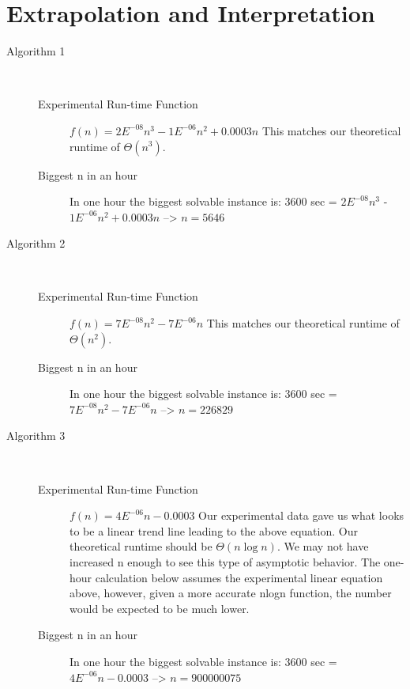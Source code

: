 \documentclass[paper=a4, fontsize=11pt]{scrartcl} %
\numberwithin{equation}{section} %
\numberwithin{figure}{section} %
\numberwithin{table}{section} %
\begin{document}
\section{Extrapolation and Interpretation}
\begin{description}
    \item[Algorithm 1] \hfill \\
    \begin{description}
        \item[Experimental Run-time Function] $f(n) = 2E^{-08}n^3 - 1E^{-06}n^2 + 0.0003n$ This matches our theoretical runtime of $\Theta(n^3)$. \\
        \item[Biggest n in an hour] In one hour the biggest solvable instance is: 3600 sec = $2E^{-08}n^3$ - $1E^{-06}n^2 + 0.0003n$ --> $n = 5646$ \\
    \end{description}

    \item[Algorithm 2] \hfill \\
    \begin{description}
        \item[Experimental Run-time Function] $f(n) = 7E^{-08}n^2 - 7E^{-06}n$  This matches our theoretical runtime of $\Theta(n^2)$. \\
        \item[Biggest n in an hour] In one hour the biggest solvable instance is: 3600 sec = $7E^{-08}n^2 - 7E^{-06}n$ --> $n = 226829$ \\
    \end{description}

    \item[Algorithm 3] \hfill \\
    \begin{description}
        \item[Experimental Run-time Function] $f(n) = 4E^{-06}n - 0.0003$  Our experimental data gave us
        what looks to be a linear trend line leading to the above equation. Our theoretical runtime 
        should be $\Theta(n\log{n})$. We may not have increased n enough to see this type of asymptotic behavior.
        The one-hour calculation below assumes the experimental linear equation above, however, 
        given a more accurate nlogn function, the number would be expected to be much lower. \\
        \item[Biggest n in an hour] In one hour the biggest solvable instance is: 3600 sec = $4E^{-06}n - 0.0003$ --> $n = 900000075$ \\
    \end{description}


\end{description}
\end{document}
